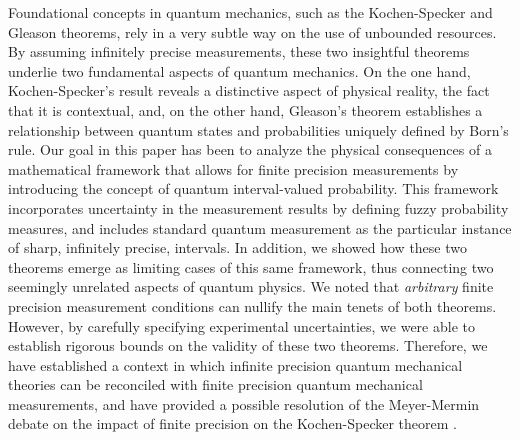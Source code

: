 \documentclass[english,reprint, aps, prl,superscriptaddress, showpacs,
showkeys, longbibliography, amsmath, amssymb]{revtex4-1}
\theoremstyle{plain}
\theoremstyle{definition}
\begin{document}
Foundational concepts in quantum mechanics, such as the Kochen-Specker and
Gleason theorems, rely in a very subtle way on the use of
unbounded resources. By assuming infinitely precise measurements,
these two insightful theorems underlie two fundamental aspects of
quantum mechanics. On the one hand, Kochen-Specker's result reveals a
distinctive aspect of physical reality, the fact that it is contextual, and, on the other hand, Gleason's theorem establishes a relationship between quantum states and probabilities uniquely defined
by Born's rule.  Our goal
in this paper has been to analyze the physical consequences of a
mathematical framework that allows for finite precision measurements
by introducing the concept of quantum interval-valued probability. This
framework incorporates uncertainty in the measurement results by defining
fuzzy probability measures, and includes standard quantum measurement
as the particular instance of sharp, infinitely precise, intervals.
In addition, we showed how these two theorems emerge as limiting cases
of this same framework, thus connecting two seemingly unrelated
aspects of quantum physics. We noted that
{\it arbitrary\/} finite precision measurement conditions can nullify the main
tenets of both theorems. However, by carefully specifying experimental uncertainties, we were able to establish rigorous bounds on the validity of these two theorems. Therefore, we have established a context in which infinite precision quantum mechanical theories can be reconciled with finite precision quantum mechanical measurements, and have provided a possible resolution of the Meyer-Mermin debate on the impact of finite precision on the Kochen-Specker theorem \cite{PhysRevLett.83.3751,Mermin1999}.



\end{document}
